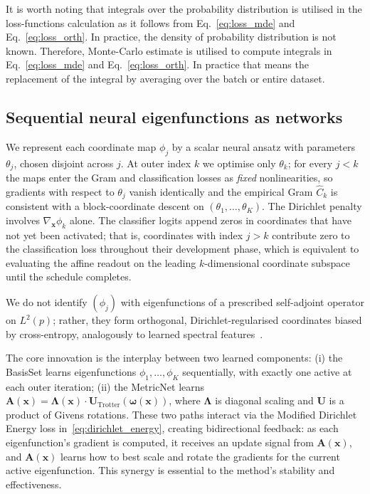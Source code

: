 \documentclass{article}
\theoremstyle{plain}
\theoremstyle{definition}
\theoremstyle{remark}
\newcommand{\new}[1]{#1}
\begin{document}
It is worth noting that integrals over the probability distribution is utilised in the loss-functions calculation
as it follows from Eq.~\eqref{eq:loss_mde} and Eq.~\eqref{eq:loss_orth}.
In practice, the density of probability distribution is not known.
Therefore, Monte-Carlo estimate is utilised to compute integrals in Eq.~\eqref{eq:loss_mde} and Eq.~\eqref{eq:loss_orth}.
In practice that means the replacement of the integral by averaging over the batch or entire dataset.

\subsection{Sequential neural eigenfunctions as networks}
\label{subsec:seq_nn_ef}

We represent each coordinate map $\phi_j$ by a scalar neural ansatz with parameters $\theta_j$, chosen disjoint across $j$.
At outer index $k$ we optimise only $\theta_k$; for every $j<k$ the maps enter the Gram and classification losses as \emph{fixed} nonlinearities, so gradients with respect to $\theta_j$ vanish identically and the empirical Gram $\hat C_k$ is consistent with a block-coordinate descent on $(\theta_1,\ldots,\theta_K)$.
The Dirichlet penalty involves $\nabla_{\mathbf{x}}\phi_k$ alone.
The classifier logits append zeros in coordinates that have not yet been activated; that is, coordinates with index $j>k$ contribute zero to the classification loss throughout their development phase, which is equivalent to evaluating the affine readout on the leading $k$-dimensional coordinate subspace until the schedule completes.

We do not identify $(\phi_j)$ with eigenfunctions of a prescribed self-adjoint operator on $L^2(p)$; rather, they form orthogonal, Dirichlet-regularised coordinates biased by cross-entropy, analogously to learned spectral features~\citep{pmlr-v162-deng22b}.

\new{The core innovation is the interplay between two learned components: (i) the BasisSet learns eigenfunctions $\phi_1, \ldots, \phi_K$ sequentially, with exactly one active at each outer iteration; (ii) the MetricNet learns $\mathbf{A}(\mathbf{x}) = \boldsymbol{\Lambda}(\mathbf{x}) \cdot \mathbf{U}_{\mathrm{Trotter}}(\boldsymbol{\omega}(\mathbf{x}))$, where $\boldsymbol{\Lambda}$ is diagonal scaling and $\mathbf{U}$ is a product of Givens rotations. These two paths interact via the Modified Dirichlet Energy loss in~\eqref{eq:dirichlet_energy}, creating bidirectional feedback: as each eigenfunction's gradient is computed, it receives an update signal from $\mathbf{A}(\mathbf{x})$, and $\mathbf{A}(\mathbf{x})$ learns how to best scale and rotate the gradients for the current active eigenfunction. This synergy is essential to the method's stability and effectiveness.}
\end{document}

